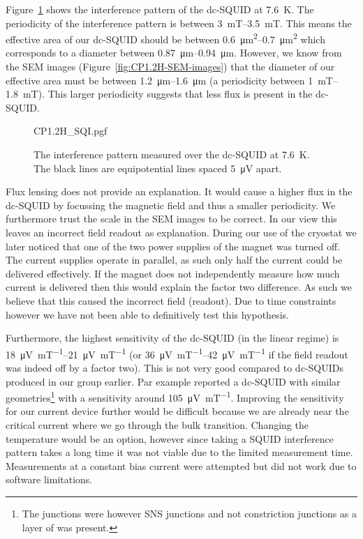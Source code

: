 Figure~\ref{fig:CP1.2H-SQUID-SQI} shows the interference pattern of the dc-SQUID at \qty{7.6}{\kelvin}. The periodicity of the interference pattern is between \qtyrange{3}{3.5}{\milli\tesla}. This means the effective area of our dc-SQUID should be between \qtyrange{0.6}{0.7}{\square\micro\meter} which corresponds to a diameter between \qtyrange{0.87}{0.94}{\micro\meter}. However, we know from the SEM images (Figure~\ref{fig:CP1.2H-SEM-images}) that the diameter of our effective area must be between \qtyrange{1.2}{1.6}{\micro\meter} (a periodicity between \qtyrange{1}{1.8}{\milli\tesla}). This larger periodicity suggests that less flux is present in the dc-SQUID.

\begin{figure}[ht!]
	\centering
	{CP1.2H_SQI.pgf}
	\caption{The interference pattern measured over the dc-SQUID at \qty{7.6}{\kelvin}. The black lines are equipotential lines spaced \qty{5}{\micro\volt} apart.}
	\label{fig:CP1.2H-SQUID-SQI}
\end{figure}

Flux lensing\cite{prigozhin3DSimulationSuperconducting2018} does not provide an explanation. It would cause a higher flux in the dc-SQUID by focussing the magnetic field and thus a smaller periodicity. We furthermore trust the scale in the SEM images to be correct. In our view this leaves an incorrect field readout as explanation. During our use of the cryostat we later noticed that one of the two power supplies of the magnet was turned off. The current supplies operate in parallel, as such only half the current could be delivered effectively. If the magnet does not independently measure how much current is delivered then this would explain the factor two difference. As such we believe that this caused the incorrect field (readout). Due to time constraints however we have not been able to definitively test this hypothesis.

Furthermore, the highest sensitivity of the dc-SQUID (in the linear regime) is \qtyrange{18}{21}{\micro\volt\per\milli\tesla} (or \qtyrange{36}{42}{\micro\volt\per\milli\tesla} if the field readout was indeed off by a factor two). This is not very good compared to dc-SQUIDs produced in our group earlier. Par example \citeauthor{rogSQUIDontipMagneticMicroscopy2022} \citeyear{rogSQUIDontipMagneticMicroscopy2022} reported a dc-SQUID with similar geometries\footnote{The junctions were however SNS junctions and not constriction junctions as a layer of  was present.} with a sensitivity around \qty{105}{\micro\volt\per\milli\tesla}\cite{rogSQUIDontipMagneticMicroscopy2022}. Improving the sensitivity for our current device further would be difficult because we are already near the critical current where we go through the bulk transition. Changing the temperature would be an option, however since taking a SQUID interference pattern takes a long time it was not viable due to the limited measurement time. Measurements at a constant bias current were attempted but did not work due to software limitations.

